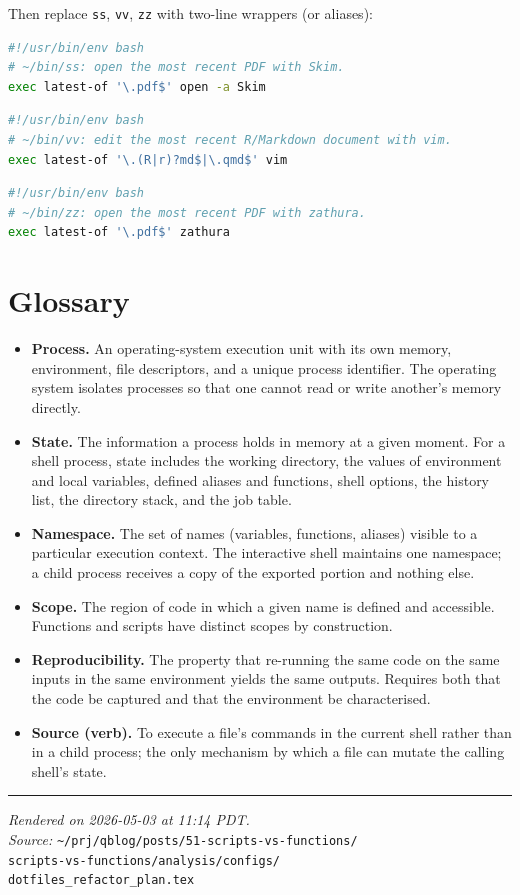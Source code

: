 \documentclass[11pt,letterpaper]{scrartcl}
\begin{document}
Then replace \texttt{ss}, \texttt{vv}, \texttt{zz} with two-line
wrappers (or aliases):

\begin{lstlisting}[language=bash]
#!/usr/bin/env bash
# ~/bin/ss: open the most recent PDF with Skim.
exec latest-of '\.pdf$' open -a Skim
\end{lstlisting}

\begin{lstlisting}[language=bash]
#!/usr/bin/env bash
# ~/bin/vv: edit the most recent R/Markdown document with vim.
exec latest-of '\.(R|r)?md$|\.qmd$' vim
\end{lstlisting}

\begin{lstlisting}[language=bash]
#!/usr/bin/env bash
# ~/bin/zz: open the most recent PDF with zathura.
exec latest-of '\.pdf$' zathura
\end{lstlisting}

\section{Glossary}

\begin{itemize}[leftmargin=1em,itemsep=4pt]
  \item \textbf{Process.}
    An operating-system execution unit with its own memory,
    environment, file descriptors, and a unique process
    identifier. The operating system isolates processes so that
    one cannot read or write another's memory directly.
  \item \textbf{State.}
    The information a process holds in memory at a given moment.
    For a shell process, state includes the working directory,
    the values of environment and local variables, defined
    aliases and functions, shell options, the history list, the
    directory stack, and the job table.
  \item \textbf{Namespace.}
    The set of names (variables, functions, aliases) visible to
    a particular execution context. The interactive shell
    maintains one namespace; a child process receives a copy of
    the exported portion and nothing else.
  \item \textbf{Scope.}
    The region of code in which a given name is defined and
    accessible. Functions and scripts have distinct scopes by
    construction.
  \item \textbf{Reproducibility.}
    The property that re-running the same code on the same
    inputs in the same environment yields the same outputs.
    Requires both that the code be captured and that the
    environment be characterised.
  \item \textbf{Source (verb).}
    To execute a file's commands in the current shell rather
    than in a child process; the only mechanism by which a file
    can mutate the calling shell's state.
\end{itemize}

\vfill
\hrule
\vspace{0.5em}
{\small \emph{Rendered on 2026-05-03 at 11:14 PDT.}\\
\emph{Source:}
\texttt{\textasciitilde/prj/qblog/posts/51-scripts-vs-functions/}\\
\hspace*{1.5em}\texttt{scripts-vs-functions/analysis/configs/}\\
\hspace*{1.5em}\texttt{dotfiles\_refactor\_plan.tex}}
\end{document}
